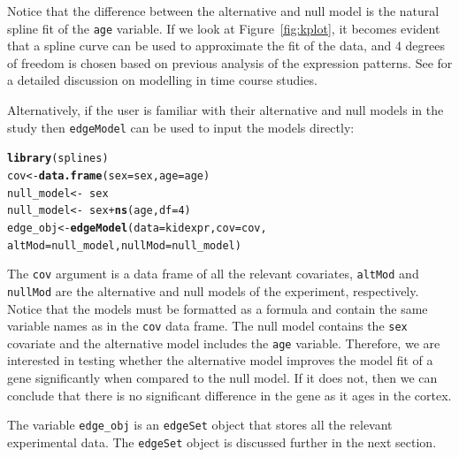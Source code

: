 \documentclass{article}\usepackage[]{graphicx}\usepackage[]{color}
\makeatletter
\newcommand{\hlnum}[1]{\textcolor[rgb]{0.686,0.059,0.569}{#1}}%
\newcommand{\hlopt}[1]{\textcolor[rgb]{0,0,0}{#1}}%
\newcommand{\hlstd}[1]{\textcolor[rgb]{0.345,0.345,0.345}{#1}}%
\newcommand{\hlkwb}[1]{\textcolor[rgb]{0.69,0.353,0.396}{#1}}%
\newcommand{\hlkwc}[1]{\textcolor[rgb]{0.333,0.667,0.333}{#1}}%
\newcommand{\hlkwd}[1]{\textcolor[rgb]{0.737,0.353,0.396}{\textbf{#1}}}%
\newenvironment{kframe}{%
 \def\at@end@of@kframe{}%
 \ifinner\ifhmode%
  \def\at@end@of@kframe{\end{minipage}}%
  \begin{minipage}{\columnwidth}%
 \fi\fi%
 \def\FrameCommand##1{\hskip\@totalleftmargin \hskip-\fboxsep
 \colorbox{shadecolor}{##1}\hskip-\fboxsep
     \hskip-\linewidth \hskip-\@totalleftmargin \hskip\columnwidth}%
 \MakeFramed {\advance\hsize-\width
   \@totalleftmargin\z@ \linewidth\hsize
   \@setminipage}}%
 {\par\unskip\endMakeFramed%
 \at@end@of@kframe}
\newenvironment{knitrout}{}{} %
\makeatother
\begin{document}
Notice that the difference between the alternative and null model is the  natural spline fit of the {\tt age} variable. If we look at Figure~\ref{fig:kplot}, it becomes evident that a spline curve can be used to approximate the fit of the data, and 4 degrees of freedom is chosen based on previous analysis of the expression patterns. See \cite{storey:2005} for a detailed discussion on modelling in time course studies. 

Alternatively, if the user is familiar with their alternative and null models in the study then {\tt edgeModel} can be used to input the models directly:
\begin{knitrout}
\color{fgcolor}\begin{kframe}
\begin{alltt}
\hlkwd{library}\hlstd{(splines)}
\hlstd{cov} \hlkwb{<-} \hlkwd{data.frame}\hlstd{(}\hlkwc{sex} \hlstd{= sex,} \hlkwc{age} \hlstd{= age)}
\hlstd{null_model} \hlkwb{<-} \hlopt{~}\hlstd{sex}
\hlstd{null_model} \hlkwb{<-} \hlopt{~}\hlstd{sex} \hlopt{+} \hlkwd{ns}\hlstd{(age,} \hlkwc{df} \hlstd{=} \hlnum{4}\hlstd{)}
\hlstd{edge_obj} \hlkwb{<-} \hlkwd{edgeModel}\hlstd{(}\hlkwc{data} \hlstd{= kidexpr,} \hlkwc{cov} \hlstd{= cov,}
    \hlkwc{altMod} \hlstd{= null_model,} \hlkwc{nullMod} \hlstd{= null_model)}
\end{alltt}
\end{kframe}
\end{knitrout}

The {\tt cov} argument is a data frame of all the relevant covariates, {\tt altMod} and {\tt nullMod} are the alternative and null models of the experiment, respectively. Notice that the models must be formatted as a formula and contain the same variable names as in the {\tt cov} data frame. The null model contains the {\tt sex} covariate and the alternative model includes the {\tt age} variable. Therefore, we are interested in testing whether the alternative model improves the model fit of a gene significantly when compared to the null model. If it does not, then we can conclude that there is no significant difference in the gene as it ages in the cortex. 

The variable {\tt edge\_obj} is an {\tt edgeSet} object that stores all the relevant experimental data. The {\tt edgeSet} object is discussed further in the next section. 
\end{document}
